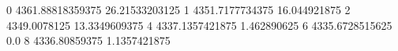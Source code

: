 0 4361.88818359375 26.21533203125
1 4351.7177734375 16.044921875
2 4349.0078125 13.3349609375
4 4337.1357421875 1.462890625
6 4335.6728515625 0.0
8 4336.80859375 1.1357421875
